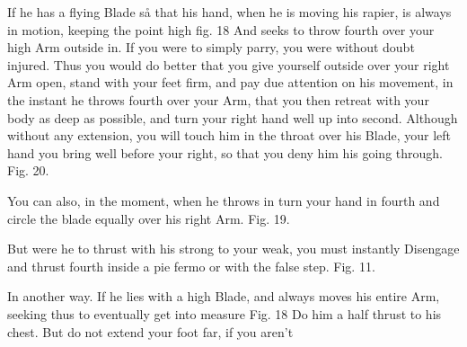 \exercise{}


If he has a flying Blade så that his hand, when he is moving his rapier, is always in motion, keeping the point high fig. 18 And seeks to throw fourth over your high Arm outside in. If you were to simply parry, you were without doubt injured. Thus you would do better that you give yourself outside over your right Arm open, stand with your feet firm, and pay due attention on his movement, in the instant he throws fourth over your Arm, that you then retreat with your body as deep as possible, and turn your right hand well up into second. Although without any extension, you will touch him in the throat over his Blade, your left hand you bring well before your right, so that you deny him his going through. Fig. 20.

\exercise{}


You can also, in the moment, when he throws in turn your hand in
fourth and circle the blade equally over his right Arm. Fig. 19.

\exercise{}


But were he to thrust with his strong to your weak, you must instantly
Disengage and thrust fourth inside a pie fermo or with the false
step. Fig. 11.

\exercise{}


In another way. If he lies with a high Blade, and always moves his
entire Arm, seeking thus to eventually get into measure Fig. 18 Do him
a half thrust to his chest. But do not extend your foot far, if you
aren't
